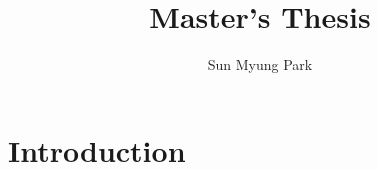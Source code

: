\documentclass[letterpaper]{article}
\begin{document}
\title{Master's Thesis}
\author{Sun Myung Park}
\date{}

\maketitle

\section*{Introduction}
\end{document}
